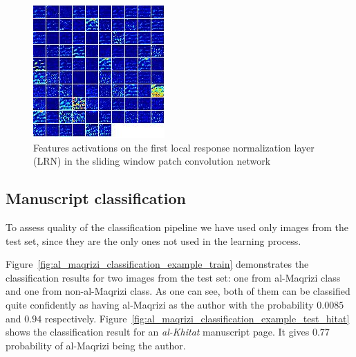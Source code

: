 \documentclass[conference,a4paper]{ieeetran}
\begin{document}
\begin{figure}[!b]
	\centering
  	\includegraphics[width=0.75\linewidth]{figures/norm1.png}
	\caption{Features activations on the first local response normalization layer (LRN) in the sliding window patch convolution network}
  	\label{fig:lrn_activation}
\end{figure}

\subsection{Manuscript classification}

To assess quality of the classification pipeline we have used only images from the test set, since they are the only ones not used in the learning process. 

Figure~\ref{fig:al_maqrizi_classification_example_train} demonstrates the classification results for two images from the test set: one from al-Maqrizi class and one from non-al-Maqrizi class. As one can see, both of them can be classified quite confidently as having al-Maqrizi as the author with the probability $0.0085$ and $0.94$ respectively. Figure~\ref{fig:al_maqrizi_classification_example_test_hitat} shows the classification result for an {\it al-Khitat} manuscript page. It gives $0.77$ probability of al-Maqrizi being the author.
\end{document}
